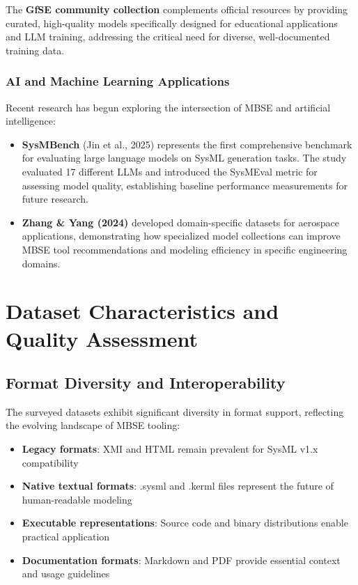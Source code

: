 \documentclass[11pt,a4paper]{article}
\begin{document}
The \textbf{GfSE community collection} complements official resources by providing curated, high-quality models specifically designed for educational applications and LLM training, addressing the critical need for diverse, well-documented training data.

\subsubsection{AI and Machine Learning Applications}

Recent research has begun exploring the intersection of MBSE and artificial intelligence:

\begin{itemize}[leftmargin=*]
    \item \textbf{SysMBench} (Jin et al., 2025) represents the first comprehensive benchmark for evaluating large language models on SysML generation tasks. The study evaluated 17 different LLMs and introduced the SysMEval metric for assessing model quality, establishing baseline performance measurements for future research.
    
    \item \textbf{Zhang \& Yang (2024)} developed domain-specific datasets for aerospace applications, demonstrating how specialized model collections can improve MBSE tool recommendations and modeling efficiency in specific engineering domains.
\end{itemize}

\section{Dataset Characteristics and Quality Assessment}

\subsection{Format Diversity and Interoperability}

The surveyed datasets exhibit significant diversity in format support, reflecting the evolving landscape of MBSE tooling:

\begin{itemize}[leftmargin=*]
    \item \textbf{Legacy formats}: XMI and HTML remain prevalent for SysML v1.x compatibility
    \item \textbf{Native textual formats}: .sysml and .kerml files represent the future of human-readable modeling
    \item \textbf{Executable representations}: Source code and binary distributions enable practical application
    \item \textbf{Documentation formats}: Markdown and PDF provide essential context and usage guidelines
\end{itemize}
\end{document}
